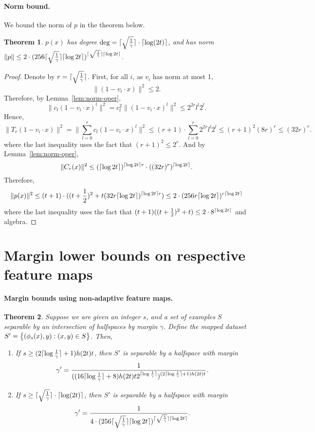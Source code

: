 \documentclass{article}
\DeclarePairedDelimiter\ceil{\lceil}{\rceil}
\newtheorem{theorem}{Theorem}
\begin{document}
\paragraph{Norm bound.} We bound the norm of $p$ in the theorem below.
\begin{theorem}
$p(x)$ has degree $\deg = \ceil{\sqrt{\frac1\gamma}} \cdot \ceil{\log(2t)}$, and has norm $\|p\| \leq 2 \cdot (256 \ceil{\sqrt{\frac1\gamma}} \ceil{\log 2t})^{\ceil{\sqrt{\frac1\gamma}} \ceil{\log 2t}}$.
\label{thm:cheb-norm}
\end{theorem}
\begin{proof}
Denote by $r = \ceil{\sqrt{\frac1\gamma}}$.
First, for all $i$, as $v_i$ has norm at most 1,
\[ \| (1 - v_i \cdot x) \|^2 \leq 2. \]
Therefore, by Lemma~\ref{lem:norm-oper},
\[ \| c_l (1 - v_i \cdot x)^l \|^2 = c_l^2 \| (1 - v_i \cdot x)^l \|^2 \leq 2^{2r} l^l 2^l. \]
Hence,
\[ \| T_r(1 - v_i \cdot x) \|^2 = \| \sum_{l=0}^r c_l (1 - v_i \cdot x)^l \|^2 \leq (r+1) \cdot \sum_{l=0}^r 2^{2r} l^l 2^l \leq (r+1)^2 (8r)^r \leq (32r)^r. \]
where the last inequality uses the fact that $(r+1)^2 \leq 2^r$.
And by Lemma~\ref{lem:norm-oper},
\[ \| C_r(x) \|^2 \leq (\ceil{\log 2t})^{\ceil{\log 2t} r} \cdot ((32r)^r)^{\ceil{\log 2t}}. \]
Therefore,
\[ \| p(x) \|^2 \leq (t+1) \cdot ((t+\frac 1 2)^2 + t (32 r\ceil{\log 2t})^{\ceil{\log 2t} r}) \leq 2 \cdot (256 r \ceil{\log 2t})^{r \ceil{\log 2t}}  \]
where the last inequality uses the fact that $(t+1)((t+\frac12)^2+t) \leq 2 \cdot 8^{\ceil{\log 2t}}$ and algebra.
\end{proof}

\section{Margin lower bounds on respective feature maps}
\paragraph{Margin bounds using non-adaptive feature maps.}
\begin{theorem}
Suppose we are given an integer $s$, and a set of examples $S$ separable by an intersection of halfspaces by margin $\gamma$. Define the mapped dataset $S'=\cbr{(\phi_s(x),y): (x,y) \in S}$. Then,
\begin{enumerate}
\item If $s \geq (2\ceil{\log \frac 1 \gamma}+1) h(2t) t$, then $S'$ is separable by a halfspace with margin
\[
\gamma' = \frac{1}{ ( (16 \ceil{\log \frac 1 \gamma} + 8 ) h(2t) t 2^{\ceil{\log \frac 1 \gamma}})^{(2\ceil{\log \frac 1 \gamma} + 1 ) h(2t) t} }.
\]
\item If $s \geq \ceil{\sqrt{\frac1\gamma}} \cdot \ceil{\log(2t)}$, then $S'$ is separable by a halfspace with margin
\[
\gamma' = \frac{1}{4 \cdot (256 \ceil{\sqrt{\frac1\gamma}} \ceil{\log 2t})^{\ceil{\sqrt{\frac1\gamma}} \ceil{\log 2t}}}.
\]
\end{enumerate}
\end{theorem}
\end{document}

